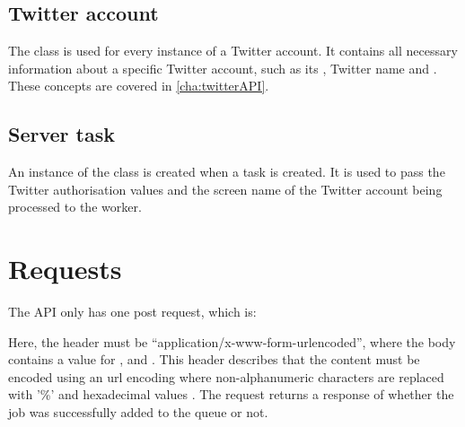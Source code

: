 \subsection{Twitter account}
The class  is used for every instance of a Twitter account. It
contains all necessary information about a specific Twitter account, such as its
, Twitter name and . These 
concepts are covered in \autoref{cha:twitterAPI}.

\subsection{Server task}
An instance of the class  is created when a task is created.
It is used to pass the Twitter authorisation values and the screen name of the
Twitter account being processed to the worker.

\section{Requests}\label{sec:queueReq}
The \ac{API} only has one post request, which is: \nl

\nl

Here, the  header must be
``application/x-www-form-urlencoded'', where the body contains a value for
,  and . This header describes that the
content must be encoded using an url encoding where non-alphanumeric characters are replaced with '\%' and
hexadecimal values \citep[sec. 17.13.4]{urlencoded}. The request returns a
response of whether the job was successfully added to the queue or not. 



